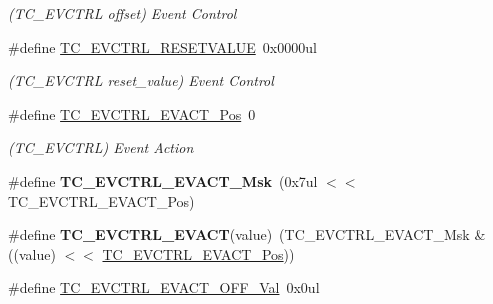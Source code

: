 \begin{DoxyCompactItemize}
\begin{DoxyCompactList}\small\item\em (T\+C\+\_\+\+E\+V\+C\+T\+R\+L offset) Event Control \end{DoxyCompactList}\item 
\hypertarget{group___s_a_m_l21___t_c_gab81c65bb678a57253551e864a9cf83be}{}\#define \hyperlink{group___s_a_m_l21___t_c_gab81c65bb678a57253551e864a9cf83be}{T\+C\+\_\+\+E\+V\+C\+T\+R\+L\+\_\+\+R\+E\+S\+E\+T\+V\+A\+L\+U\+E}~0x0000ul\label{group___s_a_m_l21___t_c_gab81c65bb678a57253551e864a9cf83be}

\begin{DoxyCompactList}\small\item\em (T\+C\+\_\+\+E\+V\+C\+T\+R\+L reset\+\_\+value) Event Control \end{DoxyCompactList}\item 
\hypertarget{group___s_a_m_l21___t_c_ga29f3c9802b04bc3c9e151e388abf2f08}{}\#define \hyperlink{group___s_a_m_l21___t_c_ga29f3c9802b04bc3c9e151e388abf2f08}{T\+C\+\_\+\+E\+V\+C\+T\+R\+L\+\_\+\+E\+V\+A\+C\+T\+\_\+\+Pos}~0\label{group___s_a_m_l21___t_c_ga29f3c9802b04bc3c9e151e388abf2f08}

\begin{DoxyCompactList}\small\item\em (T\+C\+\_\+\+E\+V\+C\+T\+R\+L) Event Action \end{DoxyCompactList}\item 
\hypertarget{group___s_a_m_l21___t_c_gaa7850522399769a9c537d974564547f7}{}\#define {\bfseries T\+C\+\_\+\+E\+V\+C\+T\+R\+L\+\_\+\+E\+V\+A\+C\+T\+\_\+\+Msk}~(0x7ul $<$$<$ T\+C\+\_\+\+E\+V\+C\+T\+R\+L\+\_\+\+E\+V\+A\+C\+T\+\_\+\+Pos)\label{group___s_a_m_l21___t_c_gaa7850522399769a9c537d974564547f7}

\item 
\hypertarget{group___s_a_m_l21___t_c_gaff25b879b46da9d6566b107f69c8f17b}{}\#define {\bfseries T\+C\+\_\+\+E\+V\+C\+T\+R\+L\+\_\+\+E\+V\+A\+C\+T}(value)~(T\+C\+\_\+\+E\+V\+C\+T\+R\+L\+\_\+\+E\+V\+A\+C\+T\+\_\+\+Msk \& ((value) $<$$<$ \hyperlink{group___s_a_m_l21___t_c_ga29f3c9802b04bc3c9e151e388abf2f08}{T\+C\+\_\+\+E\+V\+C\+T\+R\+L\+\_\+\+E\+V\+A\+C\+T\+\_\+\+Pos}))\label{group___s_a_m_l21___t_c_gaff25b879b46da9d6566b107f69c8f17b}

\item 
\hypertarget{group___s_a_m_l21___t_c_ga34fd9cc9a5f397f3200ce035f6e7dc2b}{}\#define \hyperlink{group___s_a_m_l21___t_c_ga34fd9cc9a5f397f3200ce035f6e7dc2b}{T\+C\+\_\+\+E\+V\+C\+T\+R\+L\+\_\+\+E\+V\+A\+C\+T\+\_\+\+O\+F\+F\+\_\+\+Val}~0x0ul\label{group___s_a_m_l21___t_c_ga34fd9cc9a5f397f3200ce035f6e7dc2b}


\end{DoxyCompactItemize}
